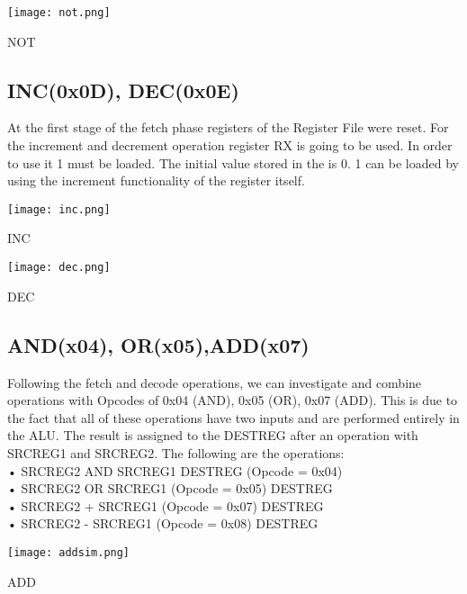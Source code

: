 \documentclass[pdftex,12pt,a4paper]{article}
\begin{document}
\begin{figure51}
	\centering
	\texttt{[image: not.png]}	
	\caption{NOT}
	\label{fig1}
\end{figure51}



\newpage

\subsection{INC(0x0D), DEC(0x0E)}
At the first stage of the fetch phase registers of the Register File were reset.
For the increment and decrement operation register RX is going to be used.
In order to use it 1 must be loaded. The initial value stored in the is 0. 1 can be
loaded by using the increment functionality of the register itself.

\begin{figure9}
	\centering
	\texttt{[image: inc.png]}	
	\caption{INC}
	\label{fig1}
\end{figure9}

\begin{figure10}
	\centering
	\texttt{[image: dec.png]}	
	\caption{DEC}
	\label{fig1}
\end{figure10}


\newpage


\subsection{AND(x04), OR(x05),ADD(x07)}
Following the fetch and decode operations, we can investigate and combine operations with Opcodes of 0x04 (AND), 0x05 (OR), 0x07 (ADD). This is due to the fact that all of these operations have two inputs and are performed entirely in the ALU. The result is assigned to the DESTREG after an operation with SRCREG1 and SRCREG2. The following are the operations:\\




• SRCREG2 AND SRCREG1 DESTREG (Opcode = 0x04)\\
• SRCREG2 OR SRCREG1 (Opcode = 0x05) DESTREG\\
• SRCREG2 + SRCREG1 (Opcode = 0x07) DESTREG\\
• SRCREG2 - SRCREG1 (Opcode = 0x08) DESTREG\\

\begin{figure41}
	\centering
	\texttt{[image: addsim.png]}	
	\caption{ADD}
	\label{fig1}
\end{figure41}
\end{document}
